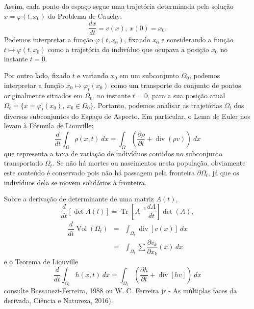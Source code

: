 Assim, cada ponto do espaço segue uma trajetória determinada pela solução \(x = \varphi(t, x_0)\) do Problema de Cauchy:
\[\dfrac{dx}{dt} = v(x),\ x(0) = x_0.\]
Podemos interpretar a função \(\varphi(t, x_0)\), fixando \(x_0\) e considerando a função \(t \mapsto \varphi(t, x_0)\) como a trajetória do indivíduo que ocupava a posição \(x_0\) no instante \(t = 0\).

Por outro lado, fixado \(t\) e variando \(x_0\) em um subconjunto \(\Omega_0\), podemos interpretar a função \(x_0 \mapsto \varphi_t(x_0)\) como um transporte do conjunto de pontos originalmente situados em \(\Omega_0\), no instante \(t = 0\), para a sua posição atual \(\Omega_t = \{x = \varphi_t(x_0),\ x_0 \in \Omega_0\}\). Portanto, podemos analisar as trajetórias \(\Omega_t\) dos diversos subconjuntos do Espaço de Aspecto. Em particular, o Lema de Euler nos levam à Fórmula de Liouville:
\[\dfrac{d}{dt} \int_{\Omega} \rho(x,t)\ dx = \int_{\Omega} \left(\dfrac{\partial \rho}{\partial t} + \operatorname{div}(\rho v)\right)\ dx\]
que representa a taxa de variação de indivíduos contidos no subconjunto transportado \(\Omega_t\). Se não há mortes ou nascimentos nesta população, obviamente este conteúdo é conservado pois não há passagem pela fronteira \(\partial \Omega_t\), já que os indivíduos dela se movem solidários à fronteira.

Sobre a derivação de determinante de uma matriz \(A(t)\),
\[\dfrac{d}{dt}[\det A(t)] = \operatorname{Tr}\left[A^{-1} \dfrac{dA}{dt}\right] \det(A),\]
\begin{eqnarray*}
\dfrac{d}{dt} \operatorname{Vol}(\Omega_t)
&=& \int_{\Omega_t} \operatorname{div}[v(x)]\ dx \\
&=& \int_{\Omega_t} \sum \dfrac{\partial v_k}{\partial x_k}(x)\ dx
\end{eqnarray*}
e o Teorema de Liouville
\[
\dfrac{d}{dt} \int_{\Omega_t} h(x,t)\ dx = \int_{\Omega_t} \left(\dfrac{\partial h}{\partial t} + \operatorname{div}[hv]\right)\ dx
\]
consulte Bassanezi-Ferreira, 1988 ou W. C. Ferreira jr - As múltiplas faces da derivada, Ciência e Natureza, 2016).


